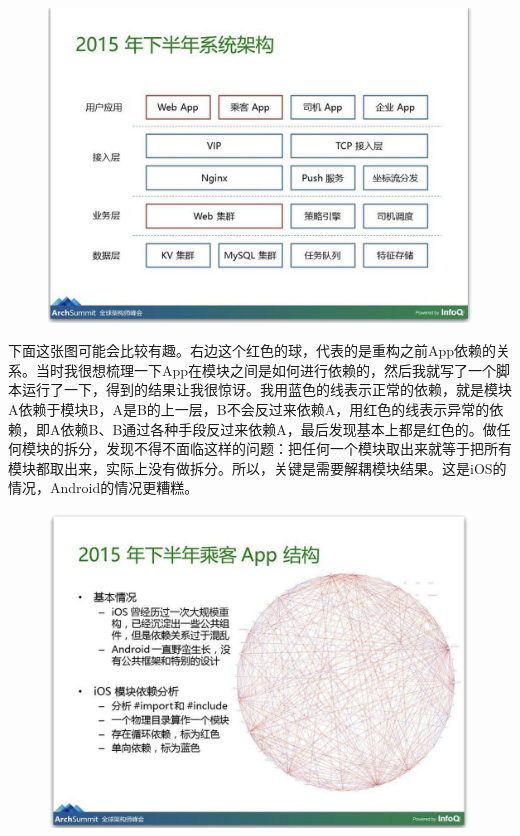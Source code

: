 \documentclass[12pt]{article}
\begin{document}
\begin{figure}[H]
    \centering
    \includegraphics[width=1\textwidth]{fig/DIDI_Reconstruction_4.png}
\end{figure}

下面这张图可能会比较有趣。右边这个红色的球，代表的是重构之前App依赖的关系。当时我很想梳理一下App在模块之间是如何进行依赖的，然后我就写了一个脚本运行了一下，得到的结果让我很惊讶。我用蓝色的线表示正常的依赖，就是模块A依赖于模块B，A是B的上一层，B不会反过来依赖A，用红色的线表示异常的依赖，即A依赖B、B通过各种手段反过来依赖A，最后发现基本上都是红色的。做任何模块的拆分，发现不得不面临这样的问题：把任何一个模块取出来就等于把所有模块都取出来，实际上没有做拆分。所以，关键是需要解耦模块结果。这是iOS的情况，Android的情况更糟糕。

\begin{figure}[H]
    \centering
    \includegraphics[width=1\textwidth]{fig/DIDI_Reconstruction_5.png}
\end{figure}
\end{document}
